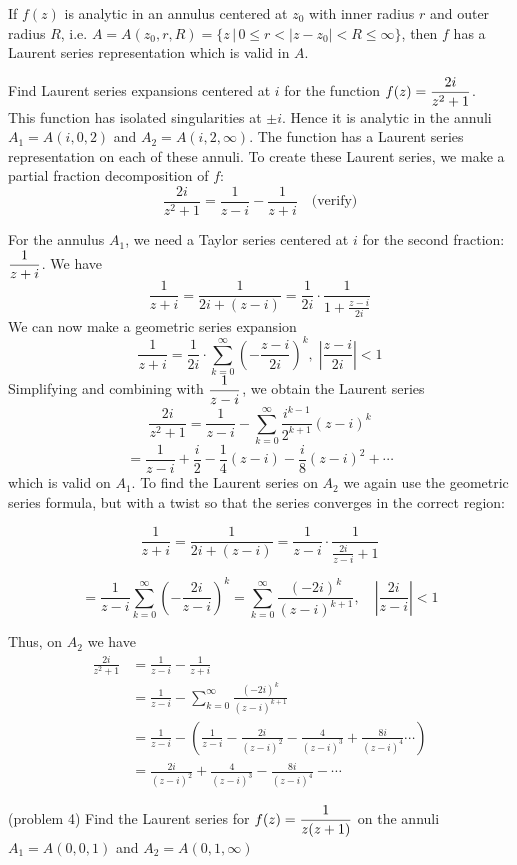 \documentclass[handout]{ximera}
\begin{document}
\begin{theorem}
If $f(z)$ is analytic in an annulus centered at $z_0$ with inner radius $r$ and outer radius $R$, i.e. $A = A(z_0, r, R) = \{z\,\big|\, 0\leq r <|z-z_0| < R \leq \infty\}$, then 
$f$ has a Laurent series representation which is valid in $A$.
\end{theorem}

\begin{example}[example 4]
Find Laurent series expansions centered at $i$ for the function $\displaystyle f(z) = \frac{2i}{z^2+1}$.\\
This function has isolated singularities at $\pm i$. Hence it is analytic in the annuli
$A_1 = A(i,0,2)$ and $A_2 = A(i, 2, \infty)$. The function has a Laurent series representation on each of these annuli.
To create these Laurent series, we make a partial fraction decomposition of $f$:
\[
\frac{2i}{z^2+1} = \frac{1}{z-i} - \frac{1}{z+i} \quad \text{(verify)}
\]

For the annulus $A_1$, we need a Taylor series centered at $i$ for the second fraction: $\displaystyle \frac{1}{z+i}$.
We have
\[
\frac{1}{z+i} = \frac{1}{2i+(z-i)} = \frac{1}{2i} \cdot \frac{1}{1+ \frac{z-i}{2i}}
\]
We can now make a geometric series expansion 
\[
\frac{1}{z+i} = \frac{1}{2i} \cdot \sum_{k=0}^\infty \left(-\frac{z-i}{2i}\right)^k, \; \left|\frac{z-i}{2i}\right| < 1
\]
Simplifying and combining with $\displaystyle \frac{1}{z-i}$, we obtain the Laurent series
\[
\frac{2i}{z^2+1} = \frac{1}{z-i} - \sum_{k=0}^\infty \frac{i^{k-1}}{2^{k+1}}(z-i)^k 
\]
\[
= \frac{1}{z-i} + \frac{i}{2} - \frac{1}{4}(z-i) - \frac{i}{8}(z-i)^2 + \cdots
\]
which is valid on $A_1$.
To find the Laurent series on $A_2$ we again use the geometric series formula, but with a twist so that the series converges in the correct region:

\[
\frac{1}{z+i} = \frac{1}{2i + (z-i)} = \frac{1}{z-i} \cdot  \frac{1}{\frac{2i}{z-i} +1}
\]

\[
= \frac{1}{z-i} \sum_{k=0}^\infty \left(-\frac{2i}{z-i}\right)^k = \sum_{k=0}^\infty \frac{(-2i)^k}{(z-i)^{k+1}}, \quad \left|\frac{2i}{z-i}\right| < 1
\]

Thus, on $A_2$ we have
\begin{align*}
\frac{2i}{z^2 +1} &= \frac{1}{z-i} -\frac{1}{z+i}\\
&=\frac{1}{z-i} - \sum_{k=0}^\infty \frac{(-2i)^k}{(z-i)^{k+1}}\\
&= \frac{1}{z-i} - \left(\frac{1}{z-i}-\frac{2i}{(z-i)^2}-\frac{4}{(z-i)^3}+\frac{8i}{(z-i)^4} \cdots \right)\\
&= \frac{2i}{(z-i)^2}+\frac{4}{(z-i)^3}-\frac{8i}{(z-i)^4} -\cdots
\end{align*}


\end{example}


\begin{problem}(problem 4)
Find the Laurent series for $\displaystyle f(z) = \frac{1}{z(z+1)}$ on the annuli $A_1 = A(0, 0, 1)$ and $A_2 = A(0, 1, \infty)$
\end{problem}
\end{document}

